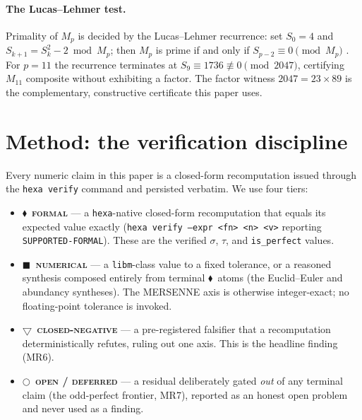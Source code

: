 \documentclass[11pt,a4paper]{article}
\newcommand{\tierF}{\textcolor{blue!60!black}{$\blacklozenge$}}   %
\newcommand{\tierN}{\textcolor{green!50!black}{$\blacksquare$}}    %
\newcommand{\tierX}{\textcolor{red!70!black}{$\bigtriangledown$}}  %
\newcommand{\tierO}{\textcolor{orange!85!black}{$\bigcirc$}}       %
\newcommand{\sig}{\sigma}
\newcommand{\Mp}{M_p}
\theoremstyle{definition}
\begin{document}
\paragraph{The Lucas--Lehmer test.} Primality of $\Mp$ is decided by the
Lucas--Lehmer recurrence: set $S_0 = 4$ and $S_{k+1}=S_k^2 - 2 \bmod \Mp$; then
$\Mp$ is prime if and only if $S_{p-2}\equiv 0 \pmod{\Mp}$
\citep{lucas-lehmer-ref}. For $p=11$ the recurrence terminates at
$S_9 \equiv 1736 \not\equiv 0 \pmod{2047}$, certifying $M_{11}$ composite without
exhibiting a factor. The factor witness $2047 = 23\times 89$ is the complementary,
constructive certificate this paper uses.

\section{Method: the verification discipline}
\label{sec:method}

Every numeric claim in this paper is a closed-form recomputation issued through
the \texttt{hexa verify} command and persisted verbatim. We use four tiers:

\begin{itemize}\itemsep0.25em
\item \tierF\ \textbf{\textsc{formal}} --- a \texttt{hexa}-native closed-form
recomputation that equals its expected value exactly
(\texttt{hexa verify --expr <fn> <n> <v>} reporting
\texttt{SUPPORTED-FORMAL}). These are the verified $\sig$, $\tau$, and
\texttt{is\_perfect} values.
\item \tierN\ \textbf{\textsc{numerical}} --- a \texttt{libm}-class value to a
fixed tolerance, or a reasoned synthesis composed entirely from terminal \tierF\
atoms (the Euclid--Euler and abundancy syntheses). The MERSENNE axis is
otherwise integer-exact; no floating-point tolerance is invoked.
\item \tierX\ \textbf{\textsc{closed-negative}} --- a pre-registered falsifier
that a recomputation deterministically refutes, ruling out one axis. This is the
headline finding (MR6).
\item \tierO\ \textbf{\textsc{open / deferred}} --- a residual deliberately gated
\emph{out} of any terminal claim (the odd-perfect frontier, MR7), reported as an
honest open problem and never used as a finding.
\end{itemize}
\end{document}
